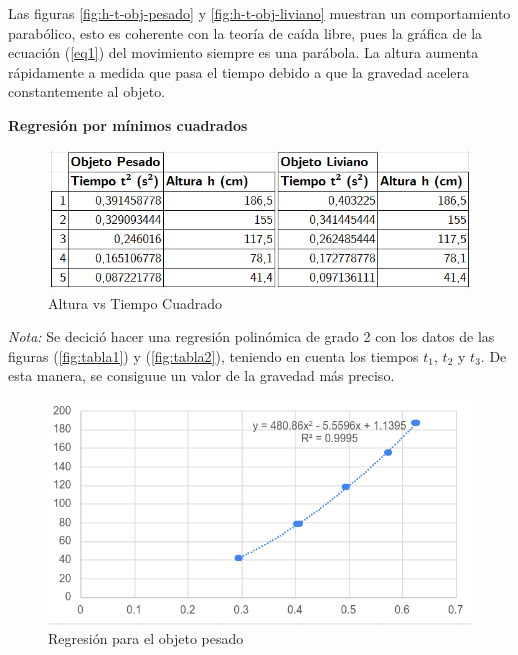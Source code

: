 \begin{multicols}{2}
Las figuras \ref{fig:h-t-obj-pesado} y \ref{fig:h-t-obj-liviano} muestran un comportamiento parabólico, esto es coherente con la teoría de caída libre, pues la gráfica de la ecuación (\ref{eq1}) del movimiento siempre es una parábola.
La altura aumenta rápidamente a medida que pasa el tiempo debido a que la gravedad acelera constantemente al objeto.

\textbf{Regresión por mínimos cuadrados}
\begin{figure}[H]
    \caption[scale=0.5]{Altura vs Tiempo Cuadrado}
    \centering
    \includegraphics[scale=0.5]{fig/Tabla3-TiempoCuadrado.png}
\end{figure}

\textit{Nota: } Se decició hacer una regresión polinómica de grado 2 con los datos de las figuras (\ref{fig:tabla1}) y (\ref{fig:tabla2}), teniendo en cuenta los tiempos $t_1$, $t_2$ y $t_3$. De esta manera, se consiguue un valor de la gravedad más preciso.
\begin{figure}[H]
    \caption{Regresión para el objeto pesado}
    \centering
    \includegraphics[scale=0.5]{fig/regresion-ObjetoPesado.png}
\end{figure}


\end{multicols}
